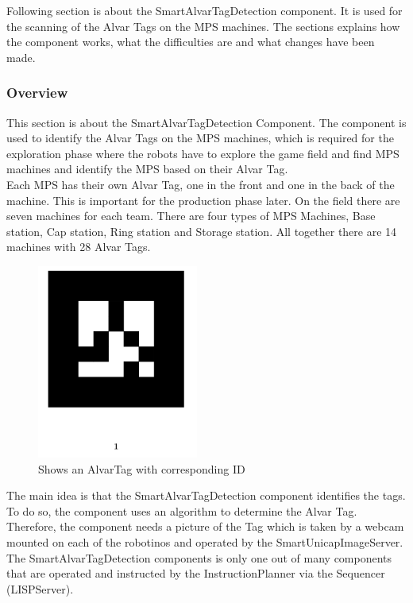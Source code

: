 Following section is about the SmartAlvarTagDetection component. It is used for the scanning of the Alvar Tags on the MPS machines. The sections explains how the component works, what the difficulties are and what changes have been made. 
 
 \subsubsection{Overview}


This section is about the SmartAlvarTagDetection Component. The component is used to identify the Alvar Tags on the MPS machines, which is required for the exploration phase where the robots have to explore the game field and find MPS machines and identify the MPS based on their Alvar Tag. \\
Each MPS has their own Alvar Tag, one in the front and one in the back of the machine. This is important for the production phase later. On the field there are seven machines for each team. There are four types of MPS Machines, Base station, Cap station, Ring station and Storage station. All together there are 14 machines with 28 Alvar Tags. \\

\begin{figure}[h]
\centering
\includegraphics[scale=0.75]{pic/numberedMarker.png}
\caption{Shows an AlvarTag with corresponding ID}
\label{fig:smartAlvarFlow}
\end{figure}

The main idea is that the SmartAlvarTagDetection component identifies the tags. To do so, the component uses an algorithm to determine the Alvar Tag. Therefore, the component needs a picture of the Tag which is taken by a webcam mounted on each of the robotinos and operated by the SmartUnicapImageServer. The SmartAlvarTagDetection components is only one out of many components that are operated and instructed by the InstructionPlanner via the Sequencer (LISPServer). \\


